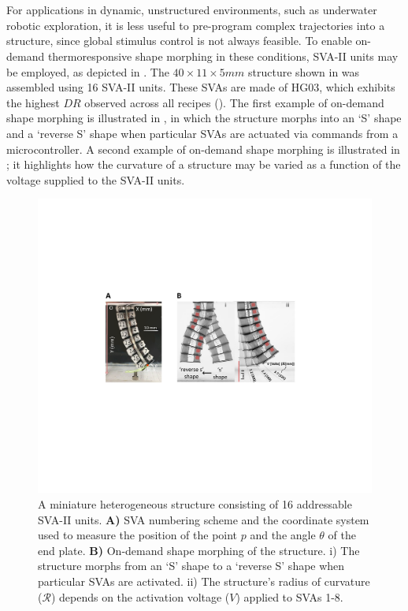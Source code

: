 \section{}
For applications in dynamic, unstructured environments, such as underwater robotic exploration, it is less useful to pre-program complex trajectories into a structure, since global stimulus control is not always feasible. To enable on-demand thermoresponsive shape morphing in these conditions, SVA-II units may be employed, as depicted in . The $40\times 11 \times 5 mm$ structure shown in  was assembled using 16 SVA-II units. These SVAs are made of HG03, which exhibits the highest $DR$ observed across all recipes (). The first example of on-demand shape morphing is illustrated in , in which the structure morphs into an `S' shape and a `reverse S' shape when particular SVAs are actuated via commands from a microcontroller. %
A second example of on-demand shape morphing is illustrated in ; it highlights how the curvature of a structure may be varied as a function of the voltage supplied to the SVA-II units.\\


\begin{figure}[!ht]
\centering
\includegraphics[width=\textwidth]{16svaArm.pdf}
\caption[]{A miniature heterogeneous structure consisting of 16 addressable SVA-II units. \textbf{A)} SVA numbering scheme and the coordinate system used to measure the position of the point $p$ and the angle $\theta$ of the end plate. \textbf{B)} On-demand shape morphing of the structure. i) The structure morphs from an `S' shape to a `reverse S' shape when particular SVAs are activated. ii) The structure's radius of curvature ($\mathcal{R}$) depends on the activation voltage ($V$) applied to SVAs 1-8.}
\label{fig:16svaArm}
\end{figure}


